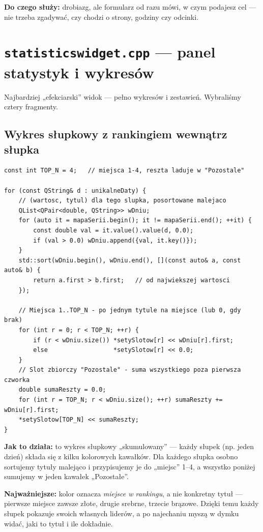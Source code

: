 \documentclass[11pt,a4paper]{article}
\begin{document}
\textbf{Do czego służy:} drobiazg, ale formularz od razu mówi, w czym podajesz
cel --- nie trzeba zgadywać, czy chodzi o strony, godziny czy odcinki.

\section{\texttt{statisticswidget.cpp} --- panel statystyk i wykresów}

Najbardziej „efekciarski” widok --- pełno wykresów i zestawień. Wybraliśmy cztery
fragmenty.

\subsection{Wykres słupkowy z rankingiem wewnątrz słupka}

\begin{lstlisting}[caption={Każdy słupek pokazuje swoich liderów}]
const int TOP_N = 4;   // miejsca 1-4, reszta laduje w "Pozostale"

for (const QString& d : unikalneDaty) {
    // (wartosc, tytul) dla tego slupka, posortowane malejaco
    QList<QPair<double, QString>> wDniu;
    for (auto it = mapaSerii.begin(); it != mapaSerii.end(); ++it) {
        const double val = it.value().value(d, 0.0);
        if (val > 0.0) wDniu.append({val, it.key()});
    }
    std::sort(wDniu.begin(), wDniu.end(), [](const auto& a, const auto& b) {
        return a.first > b.first;   // od najwiekszej wartosci
    });

    // Miejsca 1..TOP_N - po jednym tytule na miejsce (lub 0, gdy brak)
    for (int r = 0; r < TOP_N; ++r) {
        if (r < wDniu.size()) *setySlotow[r] << wDniu[r].first;
        else                  *setySlotow[r] << 0.0;
    }
    // Slot zbiorczy "Pozostale" - suma wszystkiego poza pierwsza czworka
    double sumaReszty = 0.0;
    for (int r = TOP_N; r < wDniu.size(); ++r) sumaReszty += wDniu[r].first;
    *setySlotow[TOP_N] << sumaReszty;
}
\end{lstlisting}

\textbf{Jak to działa:} to wykres słupkowy „skumulowany” --- każdy słupek
(np. jeden dzień) składa się z kilku kolorowych kawałków. Dla każdego słupka
osobno sortujemy tytuły malejąco i przypisujemy je do „miejsc” 1--4, a wszystko
poniżej sumujemy w jeden kawałek „Pozostałe”.

\textbf{Najważniejsze:} kolor oznacza \emph{miejsce w rankingu}, a nie konkretny
tytuł --- pierwsze miejsce zawsze złote, drugie srebrne, trzecie brązowe. Dzięki
temu każdy słupek pokazuje swoich własnych liderów, a po najechaniu myszą
w dymku widać, jaki to tytuł i ile dokładnie.
\end{document}
